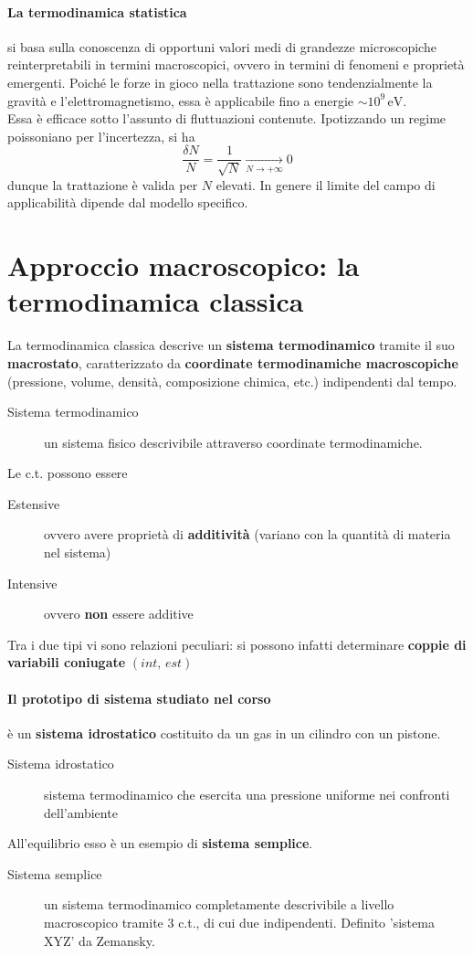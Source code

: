 \documentclass[10pt, oneside]{book}
\begin{document}
\paragraph{La termodinamica statistica} si basa sulla conoscenza di opportuni valori medi di grandezze microscopiche reinterpretabili in termini macroscopici, ovvero in termini di fenomeni e proprietà emergenti. Poiché le forze in gioco nella trattazione sono tendenzialmente la gravità e l'elettromagnetismo, essa è applicabile fino a energie $\sim 10^{9} \, \mathrm{eV}$. 
\\Essa è efficace sotto l'assunto di fluttuazioni contenute. Ipotizzando un regime poissoniano per l'incertezza, si ha
\[\frac{\delta N}{N} = \frac{1}{\sqrt{N}} \xrightarrow[N \rightarrow +\infty]{} 0\]
dunque la trattazione è valida per $N$ elevati. In genere il limite del campo di applicabilità dipende dal modello specifico.

\section{Approccio macroscopico: la termodinamica classica}
La termodinamica classica descrive un \textbf{sistema termodinamico} tramite il suo \textbf{macrostato}, caratterizzato da \textbf{coordinate termodinamiche macroscopiche} (pressione, volume, densità, composizione chimica, etc.) indipendenti dal tempo.
\begin{description}
\item[Sistema termodinamico] un sistema fisico descrivibile attraverso coordinate termodinamiche.
\end{description}
Le c.t. possono essere
\begin{description}
\item[Estensive] ovvero avere proprietà di \textbf{additività} (variano con la quantità di materia nel sistema)
\item[Intensive] ovvero \textbf{non} essere additive
\end{description}
Tra i due tipi vi sono relazioni peculiari: si possono infatti determinare \textbf{coppie di variabili coniugate} $(int, \, est)$
\paragraph{Il prototipo di sistema studiato nel corso} è un \textbf{sistema idrostatico} costituito da un gas in un cilindro con un pistone.
\begin{description}
\item[Sistema idrostatico] sistema termodinamico che esercita una pressione uniforme nei confronti dell'ambiente
\end{description}
All'equilibrio esso è un esempio di \textbf{sistema semplice}.
\begin{description}
\item[Sistema semplice] un sistema termodinamico completamente descrivibile a livello macroscopico tramite 3 c.t., di cui due indipendenti. Definito 'sistema XYZ' da Zemansky.
\end{description}
\end{document}
